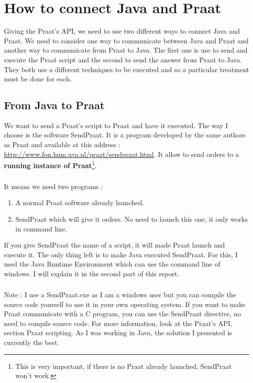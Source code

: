 \documentclass[12pt]{report}
\begin{document}
\chapter{How to connect Java and Praat}
Giving the Praat's API, we need to use two different ways to connect Java and Praat.
We need to consider one way to communicate between Java and Praat and another way to communicate from Praat to Java.
The first one is use to send and execute the Praat script and the second to send the answer from Praat to Java. They both use a different techniques to be executed and so a particular treatment must be done for each.

\section{From Java to Praat}
We want to send a Praat's script to Praat and have it executed. The way I choose is the software SendPraat. It is a program developed by the same authors as Praat and available at this address : \url{http://www.fon.hum.uva.nl/praat/sendpraat.html}. It allow to send orders to a {\bfseries running instance of Praat}\footnote{This is very important, if there is no Praat already launched, SendPraat won't work.}.

\paragraph*{}
It means we need two programs :

\begin{enumerate}
\item A normal Praat software already launched.
\item SendPraat which will give it orders. No need to launch this one, it only works in command line.
\end{enumerate}

If you give SendPraat the name of a script, it will made Praat launch and execute it. The only thing left is to make Java executed SendPraat. For this, I used the Java Runtime Environment which can use the command line of windows. I will explain it in the second part of this report.

\paragraph*{}
Note : I use a SendPraat.exe as I am a windows user but you can compile the source code yourself to use it in your own operating system. If you want to make Praat communicate with a C program, you can use the SendPraat directive, no need to compile source code. For more information, look at the Praat's API, section Praat scripting. As I was working in Java, the solution I presented is currently the best.
\end{document}
